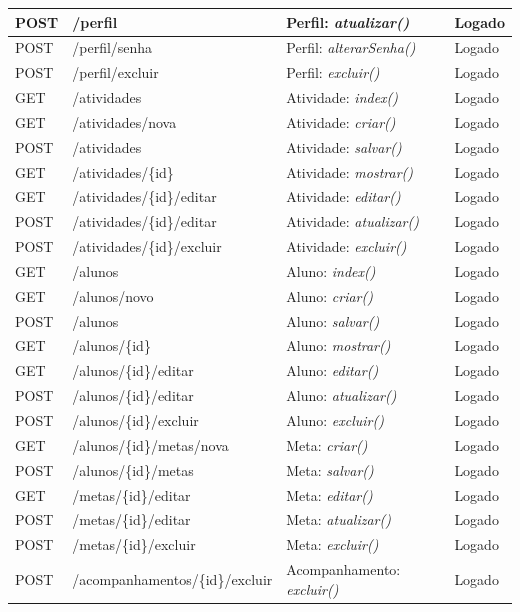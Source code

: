 \begin{tabelaIFTO}
\begin{longtable}{|L{0.0981}|L{0.3709}|L{0.3585}|L{0.1725}|}
POST & /perfil & Perfil: \textit{atualizar()} & Logado \\ \hline
POST & /perfil/senha & Perfil: \textit{alterarSenha()} & Logado \\ \hline
POST & /perfil/excluir & Perfil: \textit{excluir()} & Logado \\ \hline
GET & /atividades & Atividade: \textit{index()} & Logado \\ \hline
GET & /atividades/nova & Atividade: \textit{criar()} & Logado \\ \hline
POST & /atividades & Atividade: \textit{salvar()} & Logado \\ \hline
GET & /atividades/\{id\} & Atividade: \textit{mostrar()} & Logado \\ \hline
GET & /atividades/\{id\}/editar & Atividade: \textit{editar()} & Logado \\ \hline
POST & /atividades/\{id\}/editar & Atividade: \textit{atualizar()} & Logado \\ \hline
POST & /atividades/\{id\}/excluir & Atividade: \textit{excluir()} & Logado \\ \hline
GET & /alunos & Aluno: \textit{index()} & Logado \\ \hline
GET & /alunos/novo & Aluno: \textit{criar()} & Logado \\ \hline
POST & /alunos & Aluno: \textit{salvar()} & Logado \\ \hline
GET & /alunos/\{id\} & Aluno: \textit{mostrar()} & Logado \\ \hline
GET & /alunos/\{id\}/editar & Aluno: \textit{editar()} & Logado \\ \hline
POST & /alunos/\{id\}/editar & Aluno: \textit{atualizar()} & Logado \\ \hline
POST & /alunos/\{id\}/excluir & Aluno: \textit{excluir()} & Logado \\ \hline
GET & /alunos/\{id\}/metas/nova & Meta: \textit{criar()} & Logado \\ \hline
POST & /alunos/\{id\}/metas & Meta: \textit{salvar()} & Logado \\ \hline
GET & /metas/\{id\}/editar & Meta: \textit{editar()} & Logado \\ \hline
POST & /metas/\{id\}/editar & Meta: \textit{atualizar()} & Logado \\ \hline
POST & /metas/\{id\}/excluir & Meta: \textit{excluir()} & Logado \\ \hline
POST & /acompanhamentos/\{id\}/excluir & Acompanhamento: \textit{excluir()} & Logado \\ \hline

\end{longtable}
\end{tabelaIFTO}
